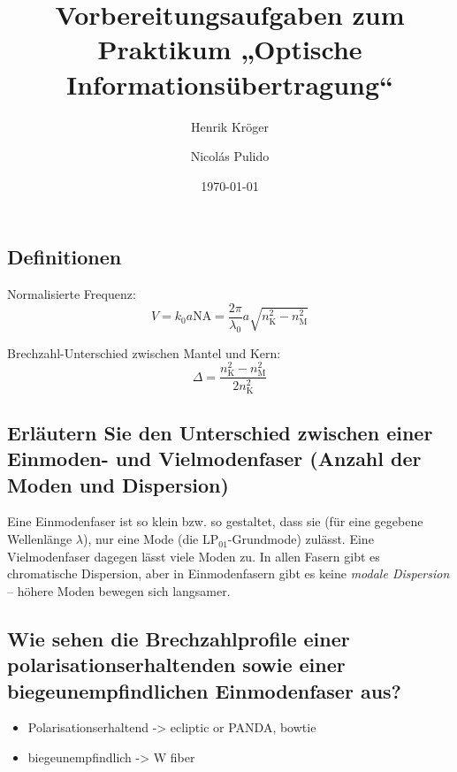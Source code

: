 \documentclass[a4paper]{scrartcl}
\title{Vorbereitungsaufgaben zum Praktikum „Optische Informationsübertragung“}
\author{Henrik Kröger \and Nicol\'as Pulido}
\date{\today}
\begin{document}
\maketitle

\subsection*{Definitionen}

Normalisierte Frequenz:
\begin{equation}
    V = k_0 a \text{NA} = \frac{2\pi}{\lambda_0} a \sqrt{n_\text{K}^2 - n_\text{M}^2}
\end{equation}

Brechzahl-Unterschied zwischen Mantel und Kern:
\begin{equation}
    \Delta = \frac{n_\text{K}^2 - n_\text{M}^2}{2n_\text{K}^2}
\end{equation}


\subsection*{Erläutern Sie den Unterschied zwischen einer Einmoden- und Vielmodenfaser
(Anzahl der Moden und Dispersion)}

Eine Einmodenfaser ist so klein bzw. so gestaltet, dass sie
(für eine gegebene Wellenlänge $\lambda$),
nur eine Mode (die $\text{LP}_{01}$-Grundmode) zulässt.
Eine Vielmodenfaser dagegen lässt viele Moden zu.
In allen Fasern gibt es chromatische Dispersion, aber in Einmodenfasern gibt es
keine \emph{modale Dispersion} – höhere Moden bewegen sich langsamer.


\subsection*{Wie sehen die Brechzahlprofile einer polarisationserhaltenden sowie einer
biegeunempfindlichen Einmodenfaser aus?}

\begin{itemize}
    \item Polarisationserhaltend -> ecliptic or PANDA, bowtie
    \item biegeunempfindlich -> W fiber
\end{itemize}
\end{document}
